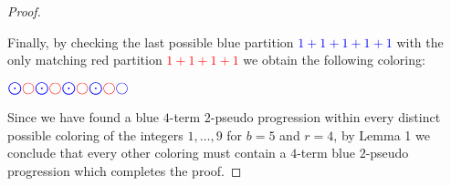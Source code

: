 \documentclass[ fontsize=10pt,twoside]{scrartcl}
\begin{document}
\begin{proof}
\begin{center}
\end{center}

Finally, by checking the last possible blue partition \textcolor{blue}{$1+1+1+1+1$} with the only matching red partition \textcolor{red}{$1+1+1+1$} we obtain the following coloring:
\begin{center}
$\textcolor{blue}{\bigodot}\textcolor{red}{\bigcirc}\textcolor{blue}{\bigodot}\textcolor{red}{\bigcirc}\textcolor{blue}{\bigodot}\textcolor{red}{\bigcirc}\textcolor{blue}{\bigodot}\textcolor{red}{\bigcirc}\textcolor{blue}{\bigcirc}$
\end{center}
Since we have found a blue $4$-term $2$-pseudo progression within every distinct possible coloring of the integers $1,\ldots,9$ for $b=5$ and $r=4$, by Lemma 1 we conclude that every other coloring must contain a $4$-term blue $2$-pseudo progression which completes the proof.
\end{proof}
\end{document}
